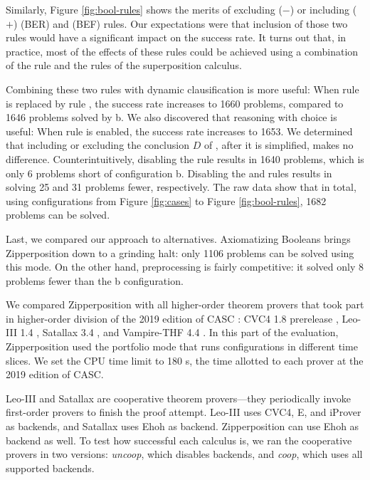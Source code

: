 Similarly, Figure \ref{fig:bool-rules} shows the merits of excluding ($-$) or including ($+$)
 (BER) and  (BEF) rules. Our
expectations were that inclusion of those two rules would have a significant impact on
the success rate. It turns out that, in practice, most of the effects of these
rules could be achieved using a combination of the  rule and the
rules of the superposition calculus.
\pagebreak[2]

Combining these two rules with dynamic clausification is more useful: When rule
 is replaced by rule , the success rate increases
to 1660 problems, compared to 1646 problems solved by b. We also discovered
that reasoning with choice is useful: When rule  is enabled, the
success rate increases to 1653. We determined that including or excluding the
conclusion $D$ of , after it is simplified, makes no difference.
Counterintuitively, disabling the  rule results in 1640 problems,
which is only 6 problems short of configuration b. Disabling the  and
 rules results in solving 25 and 31 problems fewer,
respectively. The raw data show that in total, using configurations from Figure
\ref{fig:cases} to Figure \ref{fig:bool-rules}, 1682 problems can be solved.

Last, we compared our approach to alternatives. Axiomatizing Booleans brings
Zipperposition down to a grinding halt: only 1106 problems can be solved using
this mode. On the other hand, preprocessing is fairly competitive: it solved
only 8 problems fewer than the b configuration.



We compared Zipperposition with all higher-order theorem provers that took part
in higher-order division of the 2019 edition of CASC \cite{gs-19-casc27}: CVC4 1.8 prerelease \cite{cbetal-11-cvc4},
Leo-III 1.4 \cite{sb-21-leo3}, Satallax 3.4
\cite{cb-12-satallax}, and Vampire-THF 4.4
\cite{lkav-13-vampire}. In this part of the evaluation, Zipperposition
used the portfolio mode that runs configurations in different time slices. 
We set the CPU time limit to 180 s, the time allotted to each prover at the 2019 edition of CASC.


Leo-III and Satallax are cooperative theorem provers---they periodically invoke
first-order provers to finish the proof attempt. Leo-III uses CVC4, E, and
iProver \cite{kk-08-iprover} as backends, and Satallax uses Ehoh
 as backend. Zipperposition can use Ehoh as backend as well. To test how successful each calculus is, we ran
the cooperative provers in two versions: \emph{uncoop}, which disables backends,
and \emph{coop}, which uses all supported backends.



